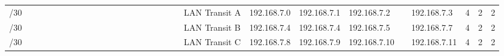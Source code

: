 \documentclass[11pt,a4paper]{report}
\begin{document}
\begin{table}[]
\begin{tabular}{rlllllllllllllllllllllllllll}
/30                                          & \multicolumn{1}{c}{} & \cellcolor[HTML]{FFFFFF} & \cellcolor[HTML]{FFFFFF} & \cellcolor[HTML]{FFFFFF} & \cellcolor[HTML]{FFFFFF} & \cellcolor[HTML]{FFFFFF} & \cellcolor[HTML]{FFFFFF} & \cellcolor[HTML]{9698ED} & \cellcolor[HTML]{9698ED} &                          &                          & \cellcolor[HTML]{FFFFFF} & \cellcolor[HTML]{FFFFFF} & \cellcolor[HTML]{FFFFFF} & \cellcolor[HTML]{FFFFFF} & \cellcolor[HTML]{FFFFFF} & \cellcolor[HTML]{FFFFFF} &  & LAN Transit A          & 192.168.7.0               & 192.168.7.1                       & 192.168.7.2                      &                          & 192.168.7.3                 & 4                          & 2                         & 2                           \\ \cline{1-1} \cline{3-18} \cline{20-28}
/30                                          &                      & \cellcolor[HTML]{FFFFFF} & \cellcolor[HTML]{FFFFFF} & \cellcolor[HTML]{FFFFFF} & \cellcolor[HTML]{FFFFFF} & \cellcolor[HTML]{9698ED} & \cellcolor[HTML]{9698ED} &                          &                          &                          &                          &                          &                          &                          &                          &                          &                          &  & LAN Transit B          & 192.168.7.4               & 192.168.7.4                       & 192.168.7.5                      &                          & 192.168.7.7                 & 4                          & 2                         & 2                           \\ \cline{1-1} \cline{3-18} \cline{20-28}
/30                                          &                      & \cellcolor[HTML]{FFFFFF} & \cellcolor[HTML]{FFFFFF} & \cellcolor[HTML]{9698ED} & \cellcolor[HTML]{9698ED} &                          &                          &                          &                          &                          &                          &                          &                          &                          &                          &                          &                          &  & LAN Transit C          & 192.168.7.8               & 192.168.7.9                       & 192.168.7.10                     &                          & 192.168.7.11                & 4                          & 2                         & 2                           \\ \cline{1-1} \cline{3-18} \cline{20-28}

\end{tabular}
\end{table}
\end{document}
